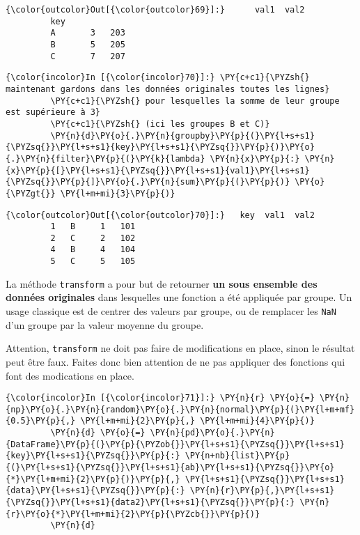 \begin{Verbatim}[commandchars=\\\{\},frame=single,framerule=0.3mm,rulecolor=\color{cellframecolor}]
{\color{outcolor}Out[{\color{outcolor}69}]:}      val1  val2
         key            
         A       3   203
         B       5   205
         C       7   207
\end{Verbatim}
            
    \begin{Verbatim}[commandchars=\\\{\},frame=single,framerule=0.3mm,rulecolor=\color{cellframecolor}]
{\color{incolor}In [{\color{incolor}70}]:} \PY{c+c1}{\PYZsh{} maintenant gardons dans les données originales toutes les lignes}
         \PY{c+c1}{\PYZsh{} pour lesquelles la somme de leur groupe est supérieure à 3}
         \PY{c+c1}{\PYZsh{} (ici les groupes B et C)}
         \PY{n}{d}\PY{o}{.}\PY{n}{groupby}\PY{p}{(}\PY{l+s+s1}{\PYZsq{}}\PY{l+s+s1}{key}\PY{l+s+s1}{\PYZsq{}}\PY{p}{)}\PY{o}{.}\PY{n}{filter}\PY{p}{(}\PY{k}{lambda} \PY{n}{x}\PY{p}{:} \PY{n}{x}\PY{p}{[}\PY{l+s+s1}{\PYZsq{}}\PY{l+s+s1}{val1}\PY{l+s+s1}{\PYZsq{}}\PY{p}{]}\PY{o}{.}\PY{n}{sum}\PY{p}{(}\PY{p}{)} \PY{o}{\PYZgt{}} \PY{l+m+mi}{3}\PY{p}{)}
\end{Verbatim}


\begin{Verbatim}[commandchars=\\\{\},frame=single,framerule=0.3mm,rulecolor=\color{cellframecolor}]
{\color{outcolor}Out[{\color{outcolor}70}]:}   key  val1  val2
         1   B     1   101
         2   C     2   102
         4   B     4   104
         5   C     5   105
\end{Verbatim}
            
    La méthode \texttt{transform} a pour but de retourner \textbf{un sous
ensemble des données originales} dans lesquelles une fonction a été
appliquée par groupe. Un usage classique est de centrer des valeurs par
groupe, ou de remplacer les \texttt{NaN} d'un groupe par la valeur
moyenne du groupe.

Attention, \texttt{transform} ne doit pas faire de modifications en
place, sinon le résultat peut être faux. Faites donc bien attention de
ne pas appliquer des fonctions qui font des modications en place.

    \begin{Verbatim}[commandchars=\\\{\},frame=single,framerule=0.3mm,rulecolor=\color{cellframecolor}]
{\color{incolor}In [{\color{incolor}71}]:} \PY{n}{r} \PY{o}{=} \PY{n}{np}\PY{o}{.}\PY{n}{random}\PY{o}{.}\PY{n}{normal}\PY{p}{(}\PY{l+m+mf}{0.5}\PY{p}{,} \PY{l+m+mi}{2}\PY{p}{,} \PY{l+m+mi}{4}\PY{p}{)}
         \PY{n}{d} \PY{o}{=} \PY{n}{pd}\PY{o}{.}\PY{n}{DataFrame}\PY{p}{(}\PY{p}{\PYZob{}}\PY{l+s+s1}{\PYZsq{}}\PY{l+s+s1}{key}\PY{l+s+s1}{\PYZsq{}}\PY{p}{:} \PY{n+nb}{list}\PY{p}{(}\PY{l+s+s1}{\PYZsq{}}\PY{l+s+s1}{ab}\PY{l+s+s1}{\PYZsq{}}\PY{o}{*}\PY{l+m+mi}{2}\PY{p}{)}\PY{p}{,} \PY{l+s+s1}{\PYZsq{}}\PY{l+s+s1}{data}\PY{l+s+s1}{\PYZsq{}}\PY{p}{:} \PY{n}{r}\PY{p}{,}\PY{l+s+s1}{\PYZsq{}}\PY{l+s+s1}{data2}\PY{l+s+s1}{\PYZsq{}}\PY{p}{:} \PY{n}{r}\PY{o}{*}\PY{l+m+mi}{2}\PY{p}{\PYZcb{}}\PY{p}{)}
         \PY{n}{d}
\end{Verbatim}


